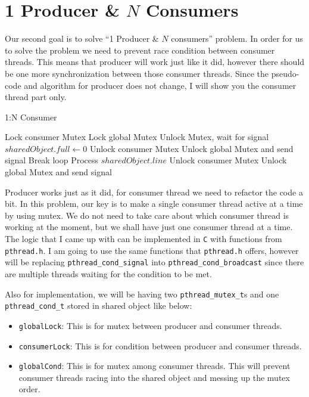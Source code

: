 \documentclass{homework}
\begin{document}
\pagebreak
\section{1 Producer \& $N$ Consumers}
Our second goal is to solve “1 Producer \& $N$ consumers” problem. In order for us to solve the problem we need to prevent race condition between consumer threads. This means that producer will work just like it did, however there should be one more synchronization between those consumer threads. Since the pseudo-code and algorithm for producer does not change, I will show you the consumer thread part only.

\begin{algorithm}
\caption{1:N Consumer}\label{alg:cap}
\begin{algorithmic}
\State Lock consumer Mutex  
\State Lock global Mutex
    \State Unlock Mutex, wait for signal  
\EndIf
\State $sharedObject.full \gets 0$
 
    \State Unlock consumer Mutex
    \State Unlock global Mutex and send signal 
    \State Break loop
\EndIf
\State Process $sharedObject.line$
\State Unlock consumer Mutex
\State Unlock global Mutex and send signal 
\EndWhile
\end{algorithmic}
\end{algorithm}

Producer works just as it did, for consumer thread we need to refactor the code a bit. In this problem, our key is to make a single consumer thread active at a time by using mutex. We do not need to take care about which consumer thread is working at the moment, but we shall have just one consumer thread at a time. The logic that I came up with can be implemented in \texttt{C} with functions from \texttt{pthread.h}. I am going to use the same functions that \texttt{pthread.h} offers, however will be replacing \texttt{pthread_cond_signal} into \texttt{pthread_cond_broadcast} since there are multiple threads waiting for the condition to be met. 
\par
Also for implementation, we will be having two \texttt{pthread_mutex_t}s and one \texttt{pthread_cond_t} stored in shared object like below:
\begin{itemize}
   \item \texttt{globalLock}: This is for mutex between producer and consumer threads.
   \item \texttt{consumerLock}: This is for condition between producer and consumer threads.
   \item \texttt{globalCond}: This is for mutex among consumer threads. This will prevent consumer threads racing into the shared object and messing up the mutex order.
\end{itemize}
\end{document}
